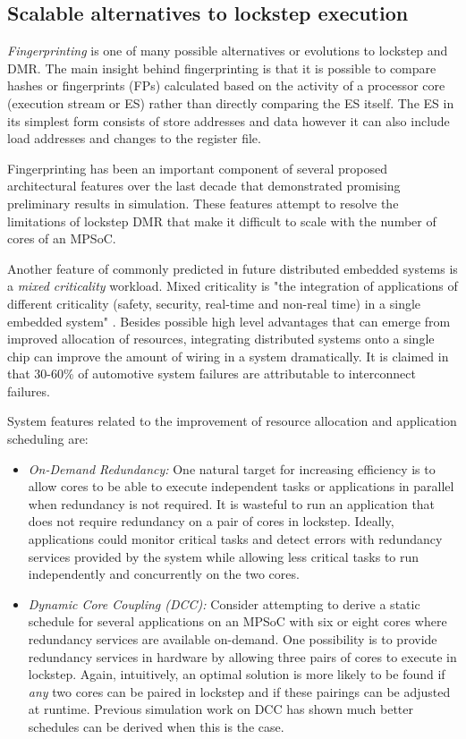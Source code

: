 \subsection{Scalable alternatives to lockstep execution}

\textit{Fingerprinting} is one of many possible alternatives or evolutions to lockstep and DMR. The main insight behind fingerprinting is that it is possible to compare hashes or fingerprints (FPs) calculated based on the activity of a processor core (execution stream or ES) rather than directly comparing the ES itself. The ES in its simplest form consists of store addresses and data however it can also include load addresses and changes to the register file. 

Fingerprinting has been an important component of several proposed architectural features over the last decade that demonstrated promising preliminary results in simulation. These features attempt to resolve the limitations of lockstep DMR that make it difficult to scale with the number of cores of an MPSoC. 

Another feature of commonly predicted in future distributed embedded systems is a \emph{mixed criticality} workload. Mixed criticality is "the integration of applications of different criticality (safety, security, real-time and non-real time) in a single embedded
system" \cite{perez2013safety}. Besides possible high level advantages that can emerge from improved allocation of resources, integrating distributed systems onto a single chip can improve the amount of wiring in a system dramatically. It is claimed in \cite{swingler2000degradation} that 30-60\% of automotive system failures are attributable to interconnect failures. 

System features related to the improvement of resource allocation and application scheduling are:
\begin{itemize}
\item \textit{On-Demand Redundancy:} One natural target for increasing efficiency is to allow cores to be able to execute independent tasks or applications in parallel when redundancy is not required. It is wasteful to run an application that does not require redundancy on a pair of cores in lockstep. Ideally, applications could monitor critical tasks and detect errors with redundancy services provided by the system while allowing less critical tasks to run independently and concurrently on the two cores.
\item \textit{Dynamic Core Coupling (DCC):} Consider attempting to derive a static schedule for several applications on an MPSoC with six or eight cores where redundancy services are available on-demand. One possibility is to provide redundancy services in hardware by allowing three pairs of cores to execute in lockstep. Again, intuitively, an optimal solution is more likely to be found if \textit{any} two cores can be paired in lockstep and if these pairings can be adjusted at runtime. Previous simulation work on DCC has shown much better schedules can be derived when this is the case.
\end{itemize}


